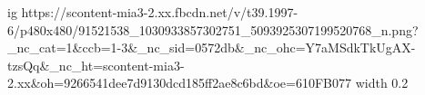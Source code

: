  
 
 
 
 
\ifcmt
  ig https://scontent-mia3-2.xx.fbcdn.net/v/t39.1997-6/p480x480/91521538_1030933857302751_5093925307199520768_n.png?_nc_cat=1&ccb=1-3&_nc_sid=0572db&_nc_ohc=Y7aMSdkTkUgAX-tzsQq&_nc_ht=scontent-mia3-2.xx&oh=9266541dee7d9130dcd185ff2ae8c6bd&oe=610FB077
  width 0.2
\fi
